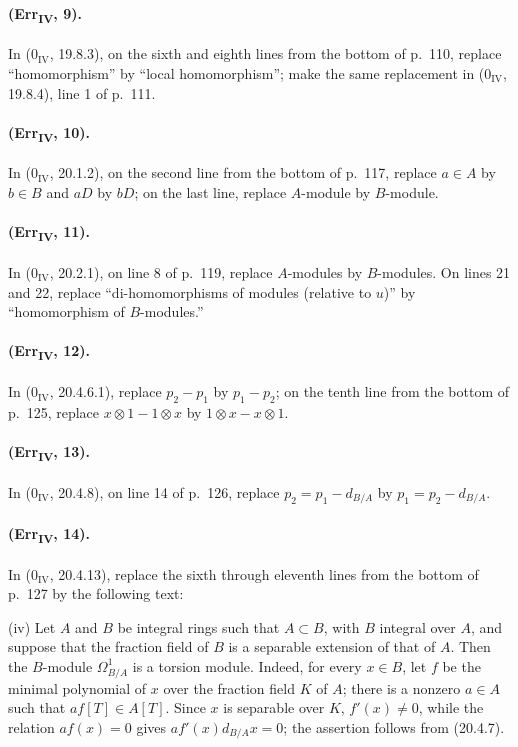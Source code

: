 \paragraph{(Err\textsubscript{IV}, 9).}
In ($0_{\mathrm{IV}}$, 19.8.3), on the sixth and eighth lines from the
bottom of p.~110, replace ``homomorphism'' by ``local homomorphism'';
make the same replacement in ($0_{\mathrm{IV}}$, 19.8.4), line 1 of
p.~111.

\paragraph{(Err\textsubscript{IV}, 10).}
In ($0_{\mathrm{IV}}$, 20.1.2), on the second line from the bottom of
p.~117, replace $a\in A$ by $b\in B$ and $aD$ by $bD$; on the last line,
replace $A$-module by $B$-module.

\paragraph{(Err\textsubscript{IV}, 11).}
In ($0_{\mathrm{IV}}$, 20.2.1), on line 8 of p.~119, replace
$A$-modules by $B$-modules.  On lines 21 and 22, replace
``di-homomorphisms of modules (relative to $u$)'' by ``homomorphism of
$B$-modules.''

\paragraph{(Err\textsubscript{IV}, 12).}
In ($0_{\mathrm{IV}}$, 20.4.6.1), replace $p_2-p_1$ by $p_1-p_2$; on
the tenth line from the bottom of p.~125, replace
$x\otimes1-1\otimes x$ by $1\otimes x-x\otimes1$.

\paragraph{(Err\textsubscript{IV}, 13).}
In ($0_{\mathrm{IV}}$, 20.4.8), on line 14 of p.~126, replace
$p_2=p_1-d_{B/A}$ by $p_1=p_2-d_{B/A}$.

\paragraph{(Err\textsubscript{IV}, 14).}
In ($0_{\mathrm{IV}}$, 20.4.13), replace the sixth through eleventh
lines from the bottom of p.~127 by the following text:

\medskip
\noindent
(iv) Let $A$ and $B$ be integral rings such that $A\subset B$, with
$B$ integral over $A$, and suppose that the fraction field of $B$ is a
separable extension of that of $A$.  Then the $B$-module
$\Omega^1_{B/A}$ is a torsion module.  Indeed, for every $x\in B$, let
$f$ be the minimal polynomial of $x$ over the fraction field $K$ of
$A$; there is a nonzero $a\in A$ such that $af[T]\in A[T]$.  Since $x$
is separable over $K$, $f'(x)\neq0$, while the relation $af(x)=0$
gives $af'(x)d_{B/A}x=0$; the assertion follows from (20.4.7).

